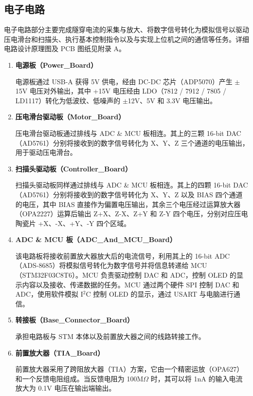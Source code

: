 \documentclass{article}
\begin{document}
\begin{spacing}{1.625}
	
	
	
	
	
	\subsection{电子电路}
		电子电路部分主要完成隧穿电流的采集与放大、将数字信号转化为模拟信号以驱动压电滑台和扫描头、执行基本控制指令以及与实现上位机之间的通信等任务。详细电路设计原理图及 PCB 图纸见附录 A。
		\begin{enumerate}
			\item \textbf{电源板（Power\_Board）}\par
			\qquad 电源板通过 USB-A 获得 5V 供电，经由 DC-DC 芯片（ADP5070）产生 $\pm$15V 电压对外输出，其中 +15V 电压经由 LDO（7812 / 7912 / 7805 / LD1117）转化为低波纹、低噪声的 $\pm$12V、5V 和 3.3V 电压输出。
			
			\item \textbf{压电滑台驱动板（Motor\_Board）}\par
			\qquad 压电滑台驱动板通过排线与 ADC \& MCU 板相连。其上的三颗 16-bit DAC（AD5761）分别将接收到的数字信号转化为 X、Y、Z 三个通道的电压输出，用于驱动压电滑台。
			
			\item \textbf{扫描头驱动板（Controller\_Board）}\par
			\qquad 扫描头驱动板同样通过排线与 ADC \& MCU 板相连。其上的四颗 16-bit DAC（AD5761）分别将接收到的数字信号转化为 X、Y、Z 以及 BIAS 四个通道的电压，其中 BIAS 直接作为偏置电压输出，其余三个电压经过运算放大器（OPA2227）运算后输出 Z+X、Z-X、Z+Y 和 Z-Y 四个电压，分别对应压电陶瓷片 +X、-X、+Y、-Y 四个区域。
			
			\item \textbf{ADC \& MCU 板（ADC\_And\_MCU\_Board）}\par
			\qquad 该电路板将接收前置放大器放大后的电流信号，利用其上的 16-bit ADC（ADS-8685）将模拟信号转化为数字信号并将信息转递给 MCU（STM32F03C8T6）。MCU 负责驱动控制 DAC 和 ADC，控制 OLED 的显示内容以及接收、传递数据的任务。MCU 通过两个硬件 SPI 控制 DAC 和 ADC，使用软件模拟 I$^\text{2}$C 控制 OLED 的显示，通过 USART 与电脑进行通信。
			
			\item \textbf{转接板（Base\_Connector\_Board）}\par
			\qquad 承担电路板与 STM 本体以及前置放大器之间的线路转接工作。
			
			\item \textbf{前置放大器（TIA\_Board）}\par
			\qquad 前置放大器采用了跨阻放大器（TIA）方案，它由一个精密运放（OPA627）和一个反馈电阻组成。当反馈电阻为 100M$\Omega$ 时，其可以将 1nA 的输入电流放大为 0.1V 电压在输出端输出。
			

\end{enumerate}
\end{spacing}
\end{document}
